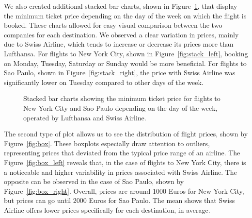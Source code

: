 We also created additional stacked bar charts, shown in Figure~\ref{fig:stacked}, that display the minimum ticket price depending on the day of the week on which the flight is booked.
These charts allowed for easy visual comparison between the two companies for each destination.
We observed a clear variation in prices, mainly due to Swiss Airline, which tends to increase or decrease its prices more than Lufthansa.
For flights to New York City, shown in Figure~\ref{fig:stack_left}, booking on Monday, Tuesday, Saturday or Sunday would be more beneficial.
For flights to Sao Paulo, shown in Figure~\ref{fig:stack_right}, the price with Swiss Airline was significantly lower on Tuesday compared to other days of the week.
\begin{figure}
    \centering
    \caption{Stacked bar charts showing the minimum ticket price for flights to New York City and Sao Paulo depending on the day of the week, operated by Lufthansa and Swiss Airline.}
    \label{fig:stacked}
\end{figure}

The second type of plot allows us to see the distribution of flight prices, shown by Figure~\ref{fig:box}.
These boxplots especially draw attention to outliers, representing prices that deviated from the typical price range of an airline.
The Figure~\ref{fig:box_left} reveals that, in the case of flights to New York City, there is a noticeable and higher variability in prices associated with Swiss Airline.
The opposite can be observed in the case of Sao Paulo, shown by Figure~\ref{fig:box_right}. Overall, prices are around 1000 Euros for New York City, but prices can go until 2000 Euros for Sao Paulo.
The mean shows that Swiss Airline offers lower prices specifically for each destination, in average.

